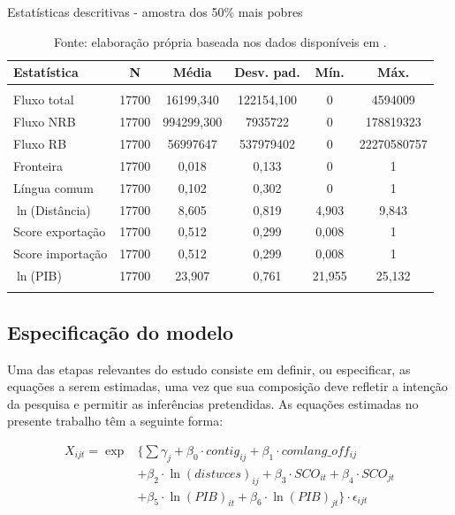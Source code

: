 \documentclass[12pt,
               openright,
               oneside,
               a4paper,
							 section=TITLE,     %
               subsection=Title,  %
               english,brazil]{article}
\begin{document}
\begin{table}[H] \centering 
	\caption{Estatísticas descritivas - amostra dos 50\% mais pobres} 
	\label{tab:descritivas_pobres} 
	\begin{tabular}{@{\extracolsep{5pt}}lccccc} 
		\\[-1.8ex]\toprule 
		Estatística & \multicolumn{1}{c}{N} & \multicolumn{1}{c}{Média} & \multicolumn{1}{c}{Desv. pad.} & \multicolumn{1}{c}{Mín.} &  \multicolumn{1}{c}{Máx.} \\ 
		\midrule \\[-1.8ex] 
		Fluxo total & 17700 & 16199,340 & 122154,100 & 0 & 4594009 \\ 
		Fluxo NRB & 17700 & 994299,300 & 7935722 & 0 & 178819323 \\ 
		Fluxo RB & 17700 & 56997647 & 537979402 & 0 & 22270580757 \\ 
		Fronteira & 17700 & 0,018 & 0,133 & 0 & 1 \\ 
		Língua comum & 17700 & 0,102 & 0,302 & 0 &  1 \\ 
		$\ln$(Distância) & 17700 & 8,605 & 0,819 & 4,903 & 9,843 \\ 
		Score exportação & 17700 & 0,512 & 0,299 & 0,008  & 1\\ 
		Score importação & 17700 & 0,512 & 0,299 & 0,008  & 1 \\ 
		$\ln$(PIB) & 17700 & 23,907 & 0,761 & 21,955 & 25,132\\
		\bottomrule \\[-1.8ex] 
	\end{tabular} 
\caption*{\RaggedRight  Fonte: elaboração própria baseada nos dados disponíveis em \cite{Cepii2019, Comtrade2019, WorldBank2019}.}
\end{table} 


\subsection{Especificação do modelo}

Uma das etapas relevantes do estudo consiste em definir, ou especificar, as equações a serem estimadas, uma vez que sua composição deve refletir a intenção da pesquisa e permitir as inferências pretendidas. As equações estimadas no presente trabalho têm a seguinte forma:

\begin{align} \label{eq:2}
 X_{ijt} = \exp & \{ \sum \gamma_j + \beta_0 \cdot contig_{ij} + \beta_1 \cdot comlang\_off_{ij}  \nonumber \\ & + \beta_2 \cdot \ln(distwces)_{ij} + \beta_3 \cdot SCO_{it} + \beta_4 \cdot SCO_{jt} \nonumber \\ & + \beta_5 \cdot \ln(PIB)_{it} + \beta_6 \cdot \ln(PIB)_{jt} \} \cdot \epsilon_{ijt}
\end{align}
\end{document}
